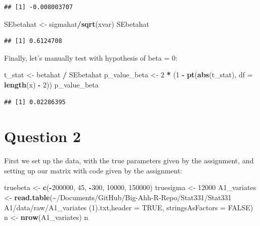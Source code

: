 \documentclass[
]{article}
\newenvironment{Shaded}{\begin{snugshade}}{\end{snugshade}}
\newcommand{\AttributeTok}[1]{\textcolor[rgb]{0.13,0.29,0.53}{#1}}
\newcommand{\ConstantTok}[1]{\textcolor[rgb]{0.56,0.35,0.01}{#1}}
\newcommand{\DecValTok}[1]{\textcolor[rgb]{0.00,0.00,0.81}{#1}}
\newcommand{\FunctionTok}[1]{\textcolor[rgb]{0.13,0.29,0.53}{\textbf{#1}}}
\newcommand{\NormalTok}[1]{#1}
\newcommand{\OtherTok}[1]{\textcolor[rgb]{0.56,0.35,0.01}{#1}}
\newcommand{\SpecialCharTok}[1]{\textcolor[rgb]{0.81,0.36,0.00}{\textbf{#1}}}
\newcommand{\StringTok}[1]{\textcolor[rgb]{0.31,0.60,0.02}{#1}}
\begin{document}
\begin{verbatim}
## [1] -0.008003707
\end{verbatim}

\begin{Shaded}
\begin{Highlighting}[]
\NormalTok{SEbetahat }\OtherTok{\textless{}{-}}\NormalTok{ sigmahat}\SpecialCharTok{/}\FunctionTok{sqrt}\NormalTok{(xvar)}
\NormalTok{SEbetahat}
\end{Highlighting}
\end{Shaded}

\begin{verbatim}
## [1] 0.6124708
\end{verbatim}

Finally, let's manually test with hypothesis of beta = 0:

\begin{Shaded}
\begin{Highlighting}[]
\NormalTok{t\_stat }\OtherTok{\textless{}{-}}\NormalTok{ betahat }\SpecialCharTok{/}\NormalTok{ SEbetahat}
\NormalTok{p\_value\_beta }\OtherTok{\textless{}{-}} \DecValTok{2} \SpecialCharTok{*}\NormalTok{ (}\DecValTok{1} \SpecialCharTok{{-}} \FunctionTok{pt}\NormalTok{(}\FunctionTok{abs}\NormalTok{(t\_stat), }\AttributeTok{df =} \FunctionTok{length}\NormalTok{(x) }\SpecialCharTok{{-}} \DecValTok{2}\NormalTok{))}
\NormalTok{p\_value\_beta}
\end{Highlighting}
\end{Shaded}

\begin{verbatim}
## [1] 0.02286395
\end{verbatim}

\section{Question 2}\label{question-2}

First we set up the data, with the true parameters given by the
assignment, and setting up our matrix with code given by the assignment:

\begin{Shaded}
\begin{Highlighting}[]
\NormalTok{truebeta }\OtherTok{\textless{}{-}} \FunctionTok{c}\NormalTok{(}\SpecialCharTok{{-}}\DecValTok{200000}\NormalTok{, }\DecValTok{45}\NormalTok{, }\SpecialCharTok{{-}}\DecValTok{300}\NormalTok{, }\DecValTok{10000}\NormalTok{, }\DecValTok{150000}\NormalTok{)}
\NormalTok{truesigma }\OtherTok{\textless{}{-}} \DecValTok{12000}
\NormalTok{A1\_variates }\OtherTok{\textless{}{-}} \FunctionTok{read.table}\NormalTok{(}\StringTok{\textquotesingle{}\textasciitilde{}/Documents/GitHub/Big{-}Ahh{-}R{-}Repo/Stat331/Stat331 A1/data/raw/A1\_variates (1).txt\textquotesingle{}}\NormalTok{,}\AttributeTok{header =} \ConstantTok{TRUE}\NormalTok{, }
                          \AttributeTok{stringsAsFactors =} \ConstantTok{FALSE}\NormalTok{)}
\NormalTok{n }\OtherTok{\textless{}{-}} \FunctionTok{nrow}\NormalTok{(A1\_variates)}
\NormalTok{n}
\end{Highlighting}
\end{Shaded}
\end{document}
